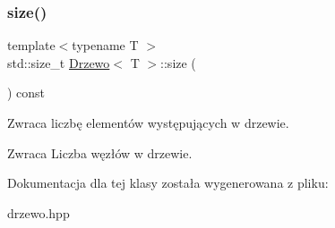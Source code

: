 \subsubsection{\texorpdfstring{size()}{size()}}
{\footnotesize\ttfamily template$<$typename T $>$ \\
std\+::size\+\_\+t \hyperlink{class_drzewo}{Drzewo}$<$ T $>$\+::size (\begin{DoxyParamCaption}{ }\end{DoxyParamCaption}) const\hspace{0.3cm}{\ttfamily [inline]}}

Zwraca liczbę elementów występujących w drzewie.

\begin{DoxyReturn}{Zwraca}
Liczba węzłów w drzewie. 
\end{DoxyReturn}


Dokumentacja dla tej klasy została wygenerowana z pliku\+:\begin{DoxyCompactItemize}
\item 
drzewo.\+hpp\end{DoxyCompactItemize}
